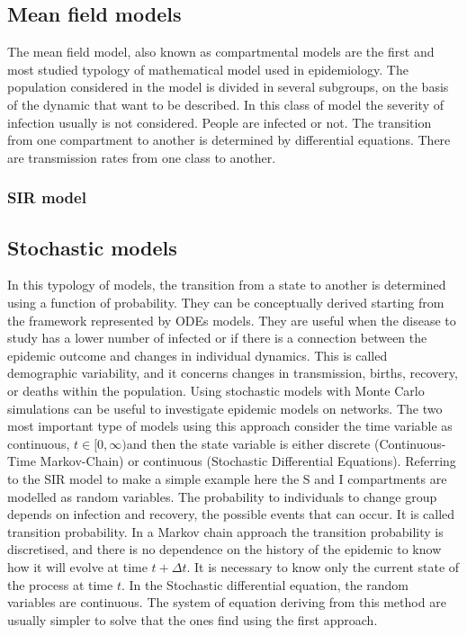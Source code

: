 \subsection{Mean field models}

The mean field model, also known as compartmental models are the first and most studied typology of mathematical model used in epidemiology.  The population considered in the model is divided in several subgroups, on the basis of the dynamic that want to be described. In this class of model  the severity of infection usually is not considered. People are infected or not. The transition from one compartment to another is determined by differential equations. There are transmission rates from one class to another. 

\subsubsection{SIR model}

\subsection{Stochastic models}
In this typology of models, the transition from a state to another is determined using a function of probability. They can be conceptually derived starting from the framework represented by ODEs models. They are useful when the disease to study has a lower number of infected or if there is a connection between the epidemic outcome and changes in individual dynamics. This is called demographic variability, and it concerns changes in transmission, births, recovery, or deaths within the population. Using stochastic models with Monte Carlo simulations can be useful to investigate epidemic models on networks. 
The two most important type of models using this approach consider the time variable as continuous, $t \in [0, \infty) $and then the state variable is either discrete (Continuous-Time Markov-Chain) or continuous (Stochastic Differential Equations).
Referring to the SIR model to make a simple example here the S and I compartments are modelled as random variables. The probability to individuals to change group depends on infection and recovery, the possible events that can occur. It is called transition probability. 
In a Markov chain approach the transition probability is discretised, and there is no dependence on the history of the epidemic to know how it will evolve at time $t + \Delta t$. It is necessary to know only the current state of the process at time $t$. 
In the Stochastic differential equation, the random variables are continuous. The system of equation deriving from this method are usually simpler to solve that the ones find using the first approach\cite{Allen2017}.  

